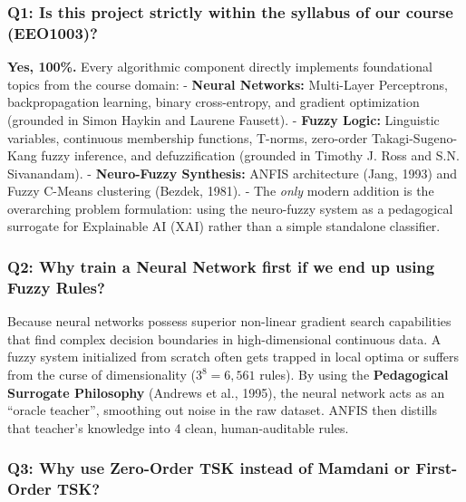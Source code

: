 \subsubsection{Q1: Is this project strictly within the syllabus of our
course
(EEO1003)?}\label{q1-is-this-project-strictly-within-the-syllabus-of-our-course-eeo1003}

\textbf{Yes, 100\%.} Every algorithmic component directly implements
foundational topics from the course domain: - \textbf{Neural Networks:}
Multi-Layer Perceptrons, backpropagation learning, binary cross-entropy,
and gradient optimization (grounded in Simon Haykin and Laurene
Fausett). - \textbf{Fuzzy Logic:} Linguistic variables, continuous
membership functions, T-norms, zero-order Takagi-Sugeno-Kang fuzzy
inference, and defuzzification (grounded in Timothy J. Ross and S.N.
Sivanandam). - \textbf{Neuro-Fuzzy Synthesis:} ANFIS architecture (Jang,
1993) and Fuzzy C-Means clustering (Bezdek, 1981). - The \emph{only}
modern addition is the overarching problem formulation: using the
neuro-fuzzy system as a pedagogical surrogate for Explainable AI (XAI)
rather than a simple standalone classifier.

\subsubsection{Q2: Why train a Neural Network first if we end up using
Fuzzy
Rules?}\label{q2-why-train-a-neural-network-first-if-we-end-up-using-fuzzy-rules}

Because neural networks possess superior non-linear gradient search
capabilities that find complex decision boundaries in high-dimensional
continuous data. A fuzzy system initialized from scratch often gets
trapped in local optima or suffers from the curse of dimensionality
(\(3^8 = 6{,}561\) rules). By using the \textbf{Pedagogical Surrogate
Philosophy} (Andrews et al., 1995), the neural network acts as an
``oracle teacher'', smoothing out noise in the raw dataset. ANFIS then
distills that teacher's knowledge into 4 clean, human-auditable rules.

\subsubsection{Q3: Why use Zero-Order TSK instead of Mamdani or
First-Order
TSK?}\label{q3-why-use-zero-order-tsk-instead-of-mamdani-or-first-order-tsk}

